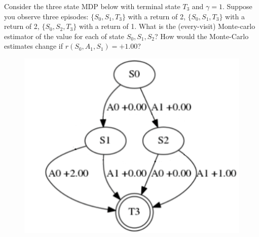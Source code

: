 Consider the three state MDP below with terminal state $T_{3 }$ and $\gamma=1$.
Suppose you observe three episodes: $\{S_{0}, S_{1} , T_{3}\}$ with a return of 2, $\{S_{0}, S_{1} , T_{3}\}$ with a return of 2, $\{S_{0}, S_{2} , T_{3}\}$ with a return of 1.
What is the (every-visit) Monte-carlo estimator of the value for each of state $S_{0}, S_{1}, S_{2}$?
How would the Monte-Carlo estimates change if $r(S_{0}, A_{1}, S_{1}) = +1.00$?

\begin{figure}[h!]
  \center
\includegraphics[width=0.5\linewidth]{figures/3state_edit.png}
\end{figure}
